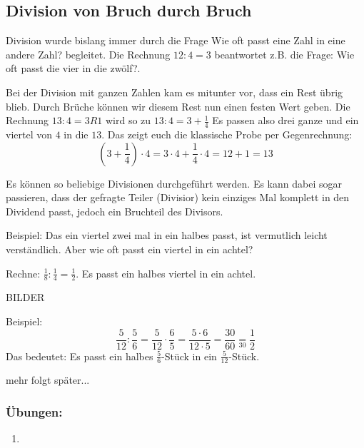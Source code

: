 \subsection{Division von Bruch durch Bruch}\vspace{-1em}
Division wurde bislang immer durch die Frage \glqq{}Wie oft passt eine Zahl in eine andere Zahl?\grqq{} begleitet. 
Die Rechnung $12:4=3$ beantwortet z.B. die Frage: \glqq{}Wie oft passt die vier in die zwölf?\grqq{}.

Bei der Division mit ganzen Zahlen kam es mitunter vor, dass ein Rest übrig blieb. Durch Brüche können wir diesem Rest nun einen festen Wert geben. Die Rechnung 
$	13:4 = 3 R 1 $ wird so zu $13:4= 3+\frac{1}{4}$
Es passen also drei ganze und ein viertel von $4$ in die $13$. Das zeigt euch die klassische Probe per Gegenrechnung:
\begin{equation*}
	\left(3+\frac{1}{4}\right)\cdot 4 = 3\cdot 4 + \frac{1}{4}\cdot 4 = 12 + 1 = 13
\end{equation*}

Es können so beliebige Divisionen durchgeführt werden. Es kann dabei sogar passieren, dass der gefragte Teiler (Divisior) kein einziges Mal komplett in den Dividend passt, jedoch ein Bruchteil des Divisors.

Beispiel: Das ein viertel zwei mal in ein halbes passt, ist vermutlich leicht verständlich. Aber wie oft passt ein viertel in ein achtel?

Rechne: $\frac{1}{8}:\frac{1}{4}=\frac{1}{2}$. Es passt ein halbes viertel in ein achtel.

BILDER


Beispiel:
\begin{equation*}
	\frac{5}{12}:\frac{5}{6}= \frac{5}{12}\cdot \frac{6}{5}=\frac{5\cdot 6}{12\cdot 5}= \frac{30}{60}\underset{30}{=}\frac{1}{2}
\end{equation*}
Das bedeutet: Es passt ein halbes $\frac{5}{6}$-Stück in ein $\frac{5}{12}$-Stück.

mehr folgt später... 

\subsubsection*{Übungen:}\vspace{-1em}
\begin{enumerate}[label=\alph*)]
	\item {}
\end{enumerate}